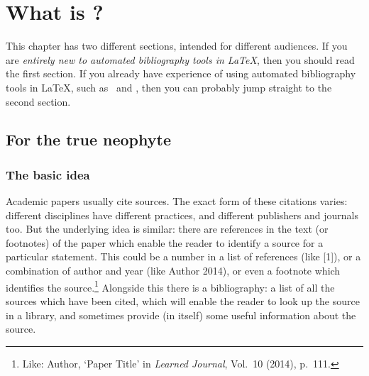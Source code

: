 \chapter{What is ?}

This chapter has two different sections, intended for different audiences. If you are \emph{entirely new to automated bibliography tools in \LaTeX}, then you should read the first section. If you already have experience of using automated bibliography tools in \LaTeX, such as \bibtex\ and , then you can probably jump straight to the second section.

\section{For the true neophyte}

\subsection{The basic idea}

Academic papers usually cite sources. The exact form of these citations varies: different disciplines have different practices, and different publishers and journals too. But the underlying idea is similar: there are references in the text (or footnotes) of the paper which enable the reader to identify a source for a particular statement. This could be a number in a list of references (like [1]), or a combination of author and year (like Author 2014), or even a footnote which identifies the source.\footnote{Like: Author, `Paper Title' in \emph{Learned Journal}, Vol.\ 10 (2014), p.\ 111.} Alongside this there is a bibliography: a list of all the sources which have been cited, which will enable the reader to look up the source in a library, and sometimes provide (in itself) some useful information about the source.

